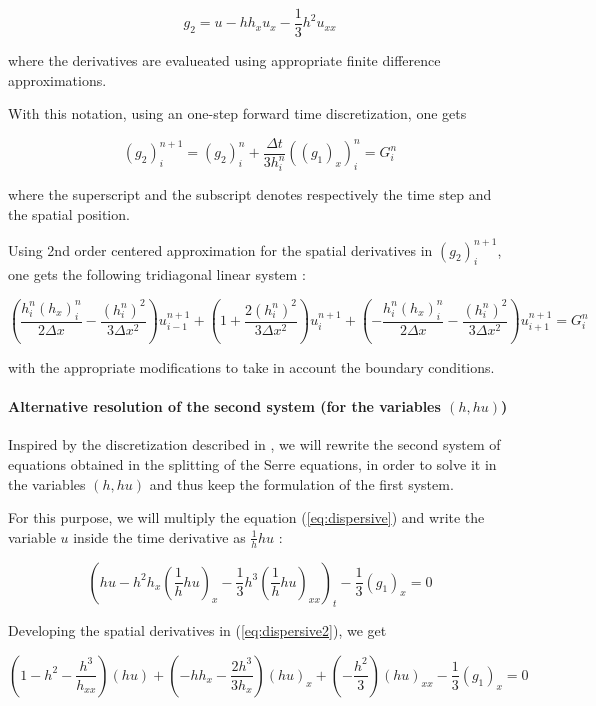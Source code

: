 $$g_2 = u - h h_x u_x - \frac{1}{3}h^2 u_{xx}$$

\noindent where the derivatives are evalueated using appropriate finite difference approximations.

\indent With this notation, using an one-step forward time discretization, one gets

$$(g_2)_i^{n+1} = (g_2)_i^n + \frac{\Delta t}{3h_i^n} \left(\left( g_1 \right)_x\right)_i^n = G_i^n$$

\noindent where the superscript and the subscript denotes respectively the time step and the spatial position.

\indent Using 2nd order centered approximation for the spatial derivatives in $(g_2)_i^{n+1}$, one gets the following tridiagonal linear system :

$$\left( \frac{h_i^n(h_x)_i^n}{2\Delta x} - \frac{(h_i^n)^2}{3\Delta x^2} \right)u_{i-1}^{n+1} + 
 \left( 1 + \frac{2(h_i^n)^2}{3\Delta x^2} \right)u_{i}^{n+1} + 
 \left( -\frac{h_i^n(h_x)_i^n}{2\Delta x} - \frac{(h_i^n)^2}{3\Delta x^2} \right)u_{i+1}^{n+1} = G_i^n $$
 
\noindent with the appropriate modifications to take in account the boundary conditions.
 
 
\paragraph{Alternative resolution of the second system (for the variables $(h,hu)$)}
 
\indent Inspired by the discretization described in \cite{Bonneton2011}, we will rewrite the second system of equations obtained in the splitting of the Serre equations, in order to solve it in the variables $(h,hu)$ and thus keep the formulation of the first system.
 
\indent For this purpose, we will multiply the equation (\ref{eq:dispersive}) and write the variable $u$ inside the time derivative as $\frac{1}{h} hu$ :
 
 \begin{equation}
\label{eq:dispersive2}
\left( hu - h^2h_x \left( \frac{1}{h} hu \right)_x - \frac{1}{3}h^3\left( \frac{1}{h} hu \right)_{xx} \right)_t  - \frac{1}{3}\left(g_1 \right)_x = 0
\end{equation}

\indent Developing the spatial derivatives in (\ref{eq:dispersive2}), we get

\begin{equation}
\label{eq:dispersive3}
       \left( 1-h^2 - \frac{h^3}{h_{xx}} \right)(hu) + \left( -hh_x - \frac{2h^3}{3h_{x}} \right)(hu)_x + \left( - \frac{h^2}{3} \right)(hu)_{xx} - \frac{1}{3}\left(g_1 \right)_x = 0
\end{equation}

